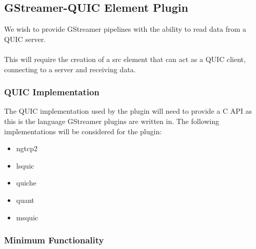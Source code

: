 \documentclass[11pt]{article}
\begin{document}
\subsection{GStreamer-QUIC Element Plugin}

We wish to provide GStreamer pipelines with the ability to read data from a QUIC server.
\\\\
This will require the creation of a src element that can act as a QUIC client, connecting to a server and receiving data. 

\subsubsection{QUIC Implementation}

The QUIC implementation used by the plugin will need to provide a C API as this is the language GStreamer plugins are written in. The following implementations will be considered for the plugin:


\begin{itemize}
    \item ngtcp2
    \item lsquic
    \item quiche
    \item quant
    \item msquic
\end{itemize}


\subsubsection{Minimum Functionality}

\end{document}
